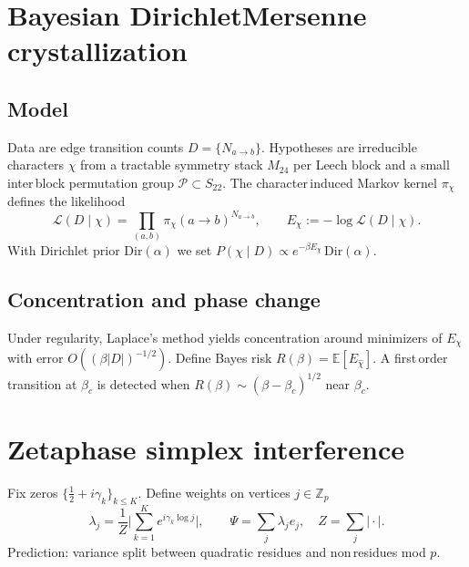 \documentclass[11pt]{article}
\theoremstyle{definition}
\newcommand{\Z}{\mathbb Z}
\begin{document}
\section{Bayesian Dirichlet\textendash Mersenne crystallization}
\subsection{Model}
Data are edge transition counts \(D=\{N_{a\to b}\}\). Hypotheses are irreducible characters \(\chi\) from a tractable symmetry stack \(M_{24}\) per Leech block and a small inter\,block permutation group \(\mathcal P\subset S_{22}\). The character\,induced Markov kernel \(\pi_\chi\) defines the likelihood
\begin{equation}
\mathcal L(D\mid \chi)=\prod_{(a,b)} \pi_\chi(a\to b)^{N_{a\to b}},\qquad E_\chi:=-\log \mathcal L(D\mid \chi).
\end{equation}
With Dirichlet prior \(\mathrm{Dir}(\alpha)\) we set \(P(\chi\mid D)\propto e^{-\beta E_\chi}\,\mathrm{Dir}(\alpha)\).

\subsection{Concentration and phase change}
Under regularity, Laplace's method yields concentration around minimizers of \(E_\chi\) with error \(O((\beta |D|)^{-1/2})\). Define Bayes risk \(R(\beta)=\mathbb E[ E_{\hat\chi}]\). A first\,order transition at \(\beta_c\) is detected when \(R(\beta)\sim (\beta-\beta_c)^{1/2}\) near \(\beta_c\).

\section{Zeta\textendash phase simplex interference}
Fix zeros \(\{\tfrac12+i\gamma_k\}_{k\le K}\). Define weights on vertices \(j\in\Z_p\)
\begin{equation}
\lambda_j=\frac{1}{Z}\Bigg|\sum_{k=1}^K e^{i\gamma_k \log j}\Bigg|,\qquad \Psi=\sum_{j}\lambda_j e_j,\quad Z=\sum_j\Big|\cdot\Big|.
\end{equation}
Prediction: variance split between quadratic residues and non\,residues mod \(p\).
\end{document}
